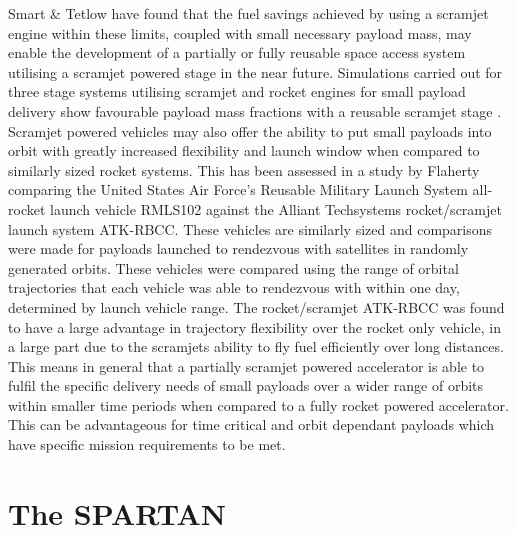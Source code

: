Smart \& Tetlow \cite{Smart2009} have found that the fuel savings achieved by using a scramjet engine within these limits, coupled with small necessary payload mass, may enable the development of a partially or fully reusable space access system utilising a scramjet powered stage in the near future. Simulations carried out  for three stage systems utilising scramjet and rocket engines for small payload delivery show favourable payload mass fractions with a reusable scramjet stage  \cite{Smart2009}. Scramjet powered vehicles may also offer the ability to put small payloads into orbit with greatly increased flexibility and launch window when compared to similarly sized rocket systems. This has been assessed in a study by Flaherty  \cite{Flaherty2010} comparing the United States Air Force's Reusable Military Launch System all-rocket launch vehicle RMLS102 against the Alliant Techsystems rocket/scramjet launch system ATK-RBCC. These vehicles are similarly sized and comparisons were made for payloads launched to rendezvous with satellites in randomly generated orbits. These vehicles were compared using the range of orbital trajectories that each vehicle was able to rendezvous with within one day, determined by launch vehicle range. The rocket/scramjet ATK-RBCC was found to have a large advantage in trajectory flexibility over the rocket only vehicle, in a large part due to the scramjets ability to fly fuel efficiently over long distances. This means in general that a partially scramjet powered accelerator  is able to fulfil the specific delivery needs of small payloads over a wider range of orbits within smaller time periods when compared to a fully rocket powered accelerator. This can be advantageous for time critical and orbit dependant payloads which have specific mission requirements to be met. 




\section{The SPARTAN}





